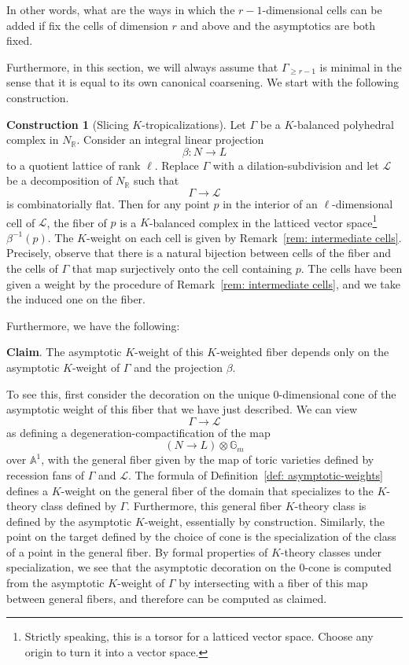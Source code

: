\documentclass[11pt]{amsart}
\theoremstyle{definition}
\theoremstyle{definition}
\newtheorem{constr}[theorem]{Construction}
\newenvironment{construction}    %
{\renewcommand{\qedsymbol}{$\lozenge$}%
	\pushQED{\qed}\begin{constr}}
	{\popQED\end{constr}}
\begin{document}
In other words, what are the ways in which the $r-1$-dimensional cells can be added if fix the cells of dimension $r$ and above and the asymptotics are both fixed. 

Furthermore, in this section, we will always assume that $\Gamma_{\geq r-1}$ is minimal in the sense that it is equal to its own canonical coarsening. We start with the following construction. 

\begin{construction}[Slicing $K$-tropicalizations]\label{con: slicing}
Let $\Gamma$ be a $K$-balanced polyhedral complex in $N_{\mathbb R}$. Consider an integral linear projection
\[
\beta \colon N\to L
\]
to a quotient lattice of rank $\ell$. Replace $\Gamma$ with a dilation-subdivision and let $\mathcal L$ be a decomposition of $N_{\mathbb R}$ such that
\[
\Gamma\to \mathcal L
\]
is combinatorially flat. Then for any point $p$ in the interior of an $\ell$-dimensional cell of $\mathcal L$, the fiber of $p$ is a $K$-balanced complex in the latticed vector space\footnote{Strictly speaking, this is a torsor for a latticed vector space. Choose any origin to turn it into a vector space. } $\beta^{-1}(p)$. The $K$-weight on each cell is given by Remark~\ref{rem: intermediate cells}. Precisely, observe that there is a natural bijection between cells of the fiber and the cells of $\Gamma$ that map surjectively onto the cell containing $p$. The cells have been given a weight by the procedure of Remark~\ref{rem: intermediate cells}, and we take the induced one on the fiber.  

Furthermore, we have the following:

\noindent
{\bf Claim}. The asymptotic $K$-weight of this $K$-weighted fiber depends only on the asymptotic $K$-weight of $\Gamma$ and the projection $\beta$. 

\noindent
To see this, first consider the decoration on the unique $0$-dimensional cone of the asymptotic weight of this fiber that we have just described. We can view
\[
\Gamma\to \mathcal L
\]
as defining a degeneration-compactification of the map 
\[
(N\to L)\otimes \mathbb G_m
\]
over $\mathbb A^1$, with the general fiber given by the map of toric varieties defined by recession fans of $\Gamma$ and $\mathcal L$. The formula of Definition~\ref{def: asymptotic-weights} defines a $K$-weight on the general fiber of the domain that specializes to the $K$-theory class defined by $\Gamma$. Furthermore, this general fiber $K$-theory class is defined by the asymptotic $K$-weight, essentially by construction. Similarly, the point on the target defined by the choice of cone is the specialization of the class of a point in the general fiber. By formal properties of $K$-theory classes under specialization, we see that the asymptotic decoration on the $0$-cone is computed from the asymptotic $K$-weight of $\Gamma$ by intersecting with a fiber of this map between general fibers, and therefore can be computed as claimed. 
\end{construction}
\end{document}
